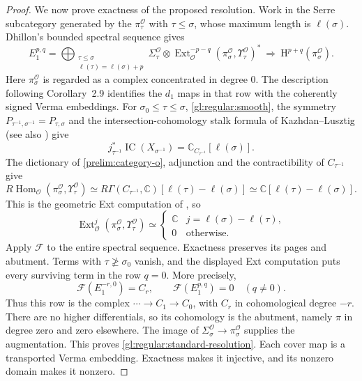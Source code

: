\documentclass[10pt,a4paper]{article}
\theoremstyle{definition}
\theoremstyle{remark}
\numberwithin{equation}{section}
\newcommand{\CC}{\mathbb{C}}
\DeclareMathOperator{\Ext}{Ext}
\begin{document}
\begin{proof}
We now prove exactness of the proposed resolution. Work in the Serre subcategory generated by
the $\pi_\tau^{\mathcal O}$ with $\tau\leq\sigma$, whose maximum
length is $\ell(\sigma)$. Dhillon's bounded spectral sequence
\cite[Corollaries~2.9 and 4.3]{RegularDhillon2019} gives
\begin{equation}\label{gl:regular:dhillon}
 E_1^{p,q}=
 \bigoplus_{\substack{\tau\leq\sigma\\
                     \ell(\tau)=\ell(\sigma)+p}}
 \Sigma_\tau^{\mathcal O}\otimes
 \Ext^{-p-q}_{\mathcal O}
       (\pi_\sigma^{\mathcal O},\Upsilon_\tau^{\mathcal O})^*
 \ \Longrightarrow\ \mathrm H^{p+q}(\pi_\sigma^{\mathcal O}).
\end{equation}
Here $\pi_\sigma^{\mathcal O}$ is regarded as a complex concentrated in degree $0$.
The description following Corollary~2.9 identifies the $d_1$ maps in
that row with the coherently signed Verma embeddings.
For $\sigma_0\leq\tau\leq\sigma$, \eqref{gl:regular:smooth}, the
symmetry $P_{\tau^{-1},\sigma^{-1}}=P_{\tau,\sigma}$ and the
intersection-cohomology stalk formula of Kazhdan--Lusztig
\cite{KL1980} (see also \cite[proof of Theorem~3.11.4(iv), p.~512]{BGS1996}) give
\[
 j_{\tau^{-1}}^*\operatorname{IC}(X_{\sigma^{-1}})
 =\CC_{C_{\tau^{-1}}}[\ell(\sigma)].
\]
The dictionary of \cref{prelim:category-o}, adjunction and the
contractibility of $C_{\tau^{-1}}$ give
\[
 R\operatorname{Hom}_{\mathcal O}
 (\pi_\sigma^{\mathcal O},\Upsilon_\tau^{\mathcal O})
 \simeq R\Gamma(C_{\tau^{-1}},\CC)[\ell(\tau)-\ell(\sigma)]
 \simeq\CC[\ell(\tau)-\ell(\sigma)].
\]
This is the geometric Ext computation of
\cite[Remark~4.6]{RegularDhillon2019}, so
\[
 \Ext^j_{\mathcal O}(\pi_\sigma^{\mathcal O},\Upsilon_\tau^{\mathcal O})
 \simeq
 \begin{cases}
  \CC&j=\ell(\sigma)-\ell(\tau),\\
  0&\text{otherwise}.
 \end{cases}
\]
Apply $\mathcal F$ to the entire spectral sequence. Exactness
preserves its pages and abutment. Terms with $\tau\not\geq\sigma_0$
vanish, and the displayed Ext computation puts every surviving term
in the row $q=0$. More precisely,
\[
 \mathcal F(E_1^{-r,0})=C_r,\qquad
 \mathcal F(E_1^{p,q})=0\quad(q\ne0).
\]
Thus this row is the complex
$\cdots\to C_1\to C_0$, with $C_r$ in cohomological degree $-r$.
There are no higher differentials, so its cohomology is the abutment,
namely $\pi$ in degree zero and zero elsewhere.
The image of $\Sigma_\sigma^{\mathcal O}\to \pi_\sigma^{\mathcal O}$
supplies the augmentation. This proves
\eqref{gl:regular:standard-resolution}.
Each cover map is a transported Verma embedding. Exactness makes it
injective, and its nonzero domain makes it nonzero.


\end{proof}
\end{document}
